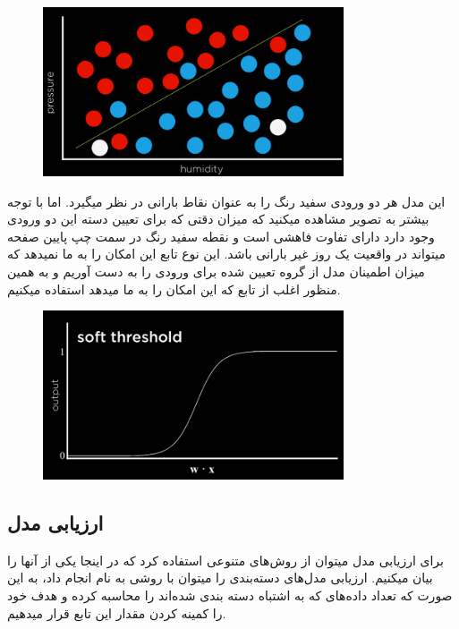\documentclass[a4paper, titlepage]{article}
\begin{document}
\begin{figure}[H]
    \center
    \includegraphics[height=5cm]{Classification-img21.png}
    \label{Classification-img21}
    \caption{}
\end{figure}

این مدل هر دو ورودی سفید رنگ را به عنوان نقاط بارانی در نظر میگیرد. اما با توجه بیشتر به تصویر مشاهده میکنید که میزان دقتی که برای تعیین دسته این دو ورودی وجود دارد دارای تفاوت فاهشی است و نقطه سفید رنگ در سمت چپ پایین صفحه میتواند در واقعیت یک روز غیر بارانی باشد. این نوع تابع  این امکان را به ما نمیدهد که میزان اطمینان مدل از گروه تعیین شده برای ورودی را به دست آوریم و به همین منظور اغلب از تابع  که این امکان را به ما میدهد استفاده میکنیم.

\begin{figure}[H]
    \center
    \includegraphics[height=5cm]{Classification-img22.png}
    \label{Classification-img22}
    \caption{}
\end{figure}

\clearpage
\subsection{ارزیابی مدل}
برای ارزیابی مدل میتوان از روش‌های متنوعی استفاده کرد که در اینجا یکی از آنها را بیان میکنیم. ارزیابی مدل‌های دسته‌بندی را میتوان با روشی به نام  انجام داد، به این صورت که تعداد داده‌های که به اشتباه دسته بندی شده‌اند را محاسبه کرده و هدف خود را کمینه کردن مقدار این تابع قرار میدهیم.
\end{document}
